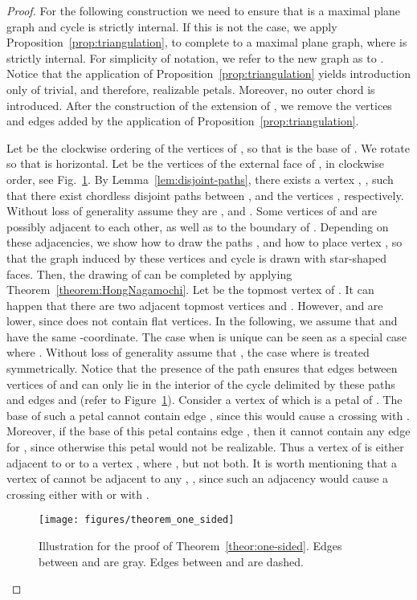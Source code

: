 \documentclass{llncs}
\begin{document}
\begin{proof}
For the following construction we need to ensure that  is a maximal plane graph and cycle  is strictly internal. If this is not the case, we apply Proposition~\ref{prop:triangulation}, to complete  to a maximal plane graph, where  is strictly internal. For simplicity of notation, we refer to the new graph as to . Notice that the application of Proposition~\ref{prop:triangulation} yields introduction only of trivial, and therefore, realizable petals. Moreover, no outer chord is introduced. After the construction of the extension of , we remove the vertices and edges added by the application of Proposition~\ref{prop:triangulation}.

Let  be the clockwise ordering of the vertices of , so that  is the base of . We rotate  so that  is horizontal.  Let  be the vertices of the external face of , in clockwise order, see Fig.~\ref{fig:menger}. By Lemma~\ref{lem:disjoint-paths}, there exists a vertex , , such that there exist chordless disjoint paths between , and the vertices , respectively. Without loss of generality assume they are ,  and . Some vertices of  and  are possibly adjacent to each other, as well as to the boundary of . Depending on these adjacencies, we show how to draw the paths ,  and how to place vertex , so that the graph induced by these vertices and cycle  is drawn with star-shaped faces. Then, the drawing of  can be completed by applying Theorem~\ref{theorem:HongNagamochi}.
Let  be the topmost vertex of . It can happen that there are two adjacent topmost vertices  and .
However,  and  are lower, since  does not contain flat vertices. In the following, we assume that  and  have the same -coordinate. The case when  is unique can be seen as a special case where .
Without loss of generality assume that , the case where  is treated symmetrically.
Notice that the presence of the path  ensures that edges between vertices of  and  can only lie in the interior of the cycle delimited by these paths and  edges  and  (refer to Figure~\ref{fig:menger}). Consider a vertex of  which is a petal of .  The base of such a petal cannot contain edge , since this would cause a crossing with .  Moreover, if the base of this petal contains edge , then it cannot contain any edge  for , since otherwise this petal would not be realizable. Thus a vertex of  is either adjacent  to  or to a vertex , where , but not both. It is worth mentioning that a vertex of  cannot be adjacent to any , , since such an adjacency would cause a crossing either with  or with . 
\begin{figure}[t]
 \centering
 {\texttt{[image: figures/theorem\_one\_sided]}}
 \caption{Illustration for the proof of Theorem~\ref{theor:one-sided}. Edges between  and  are gray. Edges between  and  are dashed.}
 \label{fig:menger} 
\end{figure} 


\end{proof}
\end{document}
